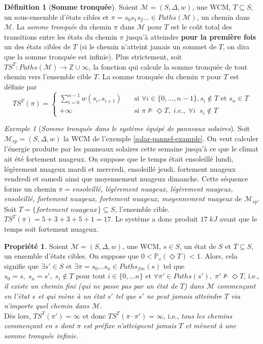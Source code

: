 \documentclass[12pt,a4paper]{report}
\theoremstyle{definition}%
\newtheorem{definition}{Définition}[chapter]
\newtheorem{propriete}{Propriété}[chapter]
\theoremstyle{remark}
\newtheorem{example}{Exemple}[chapter]
\newcommand{\ie}{i.e., }
\newcommand{\pr}{\mathbb{P}}
\begin{document}
\begin{definition}[\textbf{Somme tronquée}]
	Soient $\mathcal{M} = (S, \Delta, w)$, une WCM, $T \subseteq S$, un sous-ensemble d'états cibles et $\pi = s_0s_1s_2 \dots \in Paths(\mathcal{M})$, un chemin dans $\mathcal{M}$. La \textit{somme tronquée} du chemin $\pi$ dans $\mathcal{M}$ pour $T$ est le coût total des transitions entre les états du chemin $\pi$ jusqu'à atteindre \textbf{pour la première fois} un des états cibles de $T$ (si le chemin n'atteint jamais un sommet de $T$, on dira que la somme tronquée est infinie).
	Plus strictement,
	soit $TS^T : Paths(\mathcal{M}) \rightarrow \mathbb{Z} \cup \infty$, la fonction qui calcule la somme tronquée de tout chemin vers l'ensemble cible $T$. La somme tronquée du chemin $\pi$ pour $T$ est définie par 
	\[
		TS^T(\pi) =
		\begin{cases}
			\sum_{i = 0}^{n-1} w(s_i, s_{i+1}) & \quad \text{si } \forall i \in \{0, \dots, n - 1\}, s_i \notin T \text{ et } s_n \in T \\
			+\infty & \quad \text{si } \pi \not \models \Diamond T,\; \ie \; \forall i \;\; s_i \notin T
		\end{cases}
	\]
\end{definition}

\begin{example}[\textit{Somme tronquée dans le système équipé de panneaux solaires}]
	Soit $\mathcal{M}_{sp}=(S, \Delta, w)$ la WCM de l'exemple \ref{solar-pannel-example}. On veut calculer l'énergie produite par les panneaux solaires cette semaine jusqu'à ce que le climat ait été fortement nuageux. On suppose que le temps était ensoleillé lundi, légèrement nuageux mardi et mercredi, ensoleillé jeudi, fortement nuageux vendredi et samedi ainsi que moyennement nuageux dimanche. Cette séquence forme un chemin $\pi = $\textit{ensoleillé, légèrement nuageux, légèrement nuageux, ensoleillé, fortement nuageux, fortement nuageux, moyennement nuageux} de $\mathcal{M}_{sp}$. Soit $T = \{\textit{fortement nuageux}\} \subseteq S$, l'ensemble cible. $TS^T(\pi) = 5 + 3 + 3 + 5 + 1 = 17$. Le système a donc produit $17\; kJ$ avant que le temps soit fortement nuageux. 
\end{example}

\begin{propriete}\label{prop-ts}
	Soient $\mathcal{M} = (S, \Delta, w)$, une WCM, $s \in S$, un état de $S$ et $T \subseteq S$, un ensemble d'états cibles. On suppose que $0 < \pr_s(\Diamond T) < 1$. Alors, cela signifie que $\exists s' \in S \text{ et } \exists \pi = s_0 \dots s_n \in Paths_{fin}(s)$ tel que $s_0 = s,\; s_n = s',\; s_i \notin T \text{ pour tout } i \in \{0, \dots n \} \text{ et } \forall \pi' \in Paths(s'), \; \pi' \not \models \Diamond T$, \ie \textit{il existe un chemin fini (qui ne passe pas par un état de $T$) dans $\mathcal{M}$ commençant en l'état $s$ et qui mène à un état $s'$ tel que $s'$ ne peut jamais atteindre $T$ via n'importe quel chemin dans $\mathcal{M}$.}\\ Dès lors, $TS^T(\pi') = \infty$ et donc $TS^T(\pi \cdot \pi') = \infty$, \ie \textit{tous les chemins commençant en $s$ dont $\pi$ est préfixe n'atteignent jamais $T$ et mènent à une somme tronquée infinie.}
\end{propriete}
\end{document}
